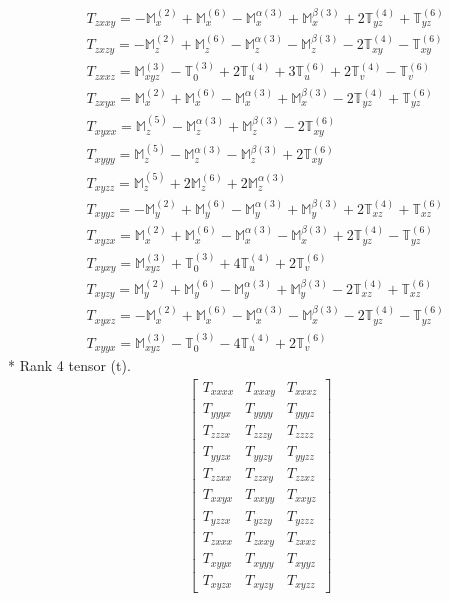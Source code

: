 \documentclass[fleqn,8pt,landscape]{jsarticle}
\begin{document}
\begin{align*}
& T_{zxxy} = - \mathbb{M}_{x}^{(2)} + \mathbb{M}_{x}^{(6)} - \mathbb{M}_{x}^{\alpha(3)} + \mathbb{M}_{x}^{\beta(3)} + 2 \mathbb{T}_{yz}^{(4)} + \mathbb{T}_{yz}^{(6)} \\
& T_{zxzy} = - \mathbb{M}_{z}^{(2)} + \mathbb{M}_{z}^{(6)} - \mathbb{M}_{z}^{\alpha(3)} - \mathbb{M}_{z}^{\beta(3)} - 2 \mathbb{T}_{xy}^{(4)} - \mathbb{T}_{xy}^{(6)} \\
& T_{zxxz} = \mathbb{M}_{xyz}^{(3)} - \mathbb{T}_{0}^{(3)} + 2 \mathbb{T}_{u}^{(4)} + 3 \mathbb{T}_{u}^{(6)} + 2 \mathbb{T}_{v}^{(4)} - \mathbb{T}_{v}^{(6)} \\
& T_{zxyx} = \mathbb{M}_{x}^{(2)} + \mathbb{M}_{x}^{(6)} - \mathbb{M}_{x}^{\alpha(3)} + \mathbb{M}_{x}^{\beta(3)} - 2 \mathbb{T}_{yz}^{(4)} + \mathbb{T}_{yz}^{(6)} \\
& T_{xyxx} = \mathbb{M}_{z}^{(5)} - \mathbb{M}_{z}^{\alpha(3)} + \mathbb{M}_{z}^{\beta(3)} - 2 \mathbb{T}_{xy}^{(6)} \\
& T_{xyyy} = \mathbb{M}_{z}^{(5)} - \mathbb{M}_{z}^{\alpha(3)} - \mathbb{M}_{z}^{\beta(3)} + 2 \mathbb{T}_{xy}^{(6)} \\
& T_{xyzz} = \mathbb{M}_{z}^{(5)} + 2 \mathbb{M}_{z}^{(6)} + 2 \mathbb{M}_{z}^{\alpha(3)} \\
& T_{xyyz} = - \mathbb{M}_{y}^{(2)} + \mathbb{M}_{y}^{(6)} - \mathbb{M}_{y}^{\alpha(3)} + \mathbb{M}_{y}^{\beta(3)} + 2 \mathbb{T}_{xz}^{(4)} + \mathbb{T}_{xz}^{(6)} \\
& T_{xyzx} = \mathbb{M}_{x}^{(2)} + \mathbb{M}_{x}^{(6)} - \mathbb{M}_{x}^{\alpha(3)} - \mathbb{M}_{x}^{\beta(3)} + 2 \mathbb{T}_{yz}^{(4)} - \mathbb{T}_{yz}^{(6)} \\
& T_{xyxy} = \mathbb{M}_{xyz}^{(3)} + \mathbb{T}_{0}^{(3)} + 4 \mathbb{T}_{u}^{(4)} + 2 \mathbb{T}_{v}^{(6)} \\
& T_{xyzy} = \mathbb{M}_{y}^{(2)} + \mathbb{M}_{y}^{(6)} - \mathbb{M}_{y}^{\alpha(3)} + \mathbb{M}_{y}^{\beta(3)} - 2 \mathbb{T}_{xz}^{(4)} + \mathbb{T}_{xz}^{(6)} \\
& T_{xyxz} = - \mathbb{M}_{x}^{(2)} + \mathbb{M}_{x}^{(6)} - \mathbb{M}_{x}^{\alpha(3)} - \mathbb{M}_{x}^{\beta(3)} - 2 \mathbb{T}_{yz}^{(4)} - \mathbb{T}_{yz}^{(6)} \\
& T_{xyyx} = \mathbb{M}_{xyz}^{(3)} - \mathbb{T}_{0}^{(3)} - 4 \mathbb{T}_{u}^{(4)} + 2 \mathbb{T}_{v}^{(6)}
\end{align*}
* Rank 4 tensor (t).
\begin{align*}
\begin{bmatrix} T_{xxxx} & T_{xxxy} & T_{xxxz} \\ T_{yyyx} & T_{yyyy} & T_{yyyz} \\ T_{zzzx} & T_{zzzy} & T_{zzzz} \\ T_{yyzx} & T_{yyzy} & T_{yyzz} \\ T_{zzxx} & T_{zzxy} & T_{zzxz} \\ T_{xxyx} & T_{xxyy} & T_{xxyz} \\ T_{yzzx} & T_{yzzy} & T_{yzzz} \\ T_{zxxx} & T_{zxxy} & T_{zxxz} \\ T_{xyyx} & T_{xyyy} & T_{xyyz} \\ T_{xyzx} & T_{xyzy} & T_{xyzz} \end{bmatrix}
\end{align*}
\end{document}
